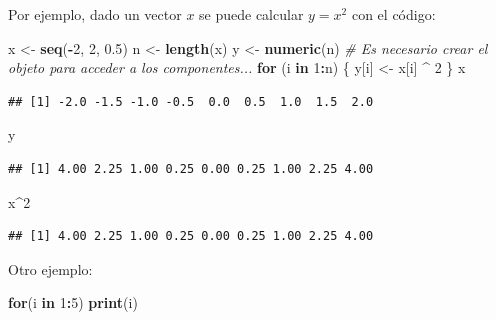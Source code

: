 \documentclass[]{book}
\newenvironment{Shaded}{\begin{snugshade}}{\end{snugshade}}
\newcommand{\CommentTok}[1]{\textcolor[rgb]{0.56,0.35,0.01}{\textit{#1}}}
\newcommand{\ControlFlowTok}[1]{\textcolor[rgb]{0.13,0.29,0.53}{\textbf{#1}}}
\newcommand{\DecValTok}[1]{\textcolor[rgb]{0.00,0.00,0.81}{#1}}
\newcommand{\FloatTok}[1]{\textcolor[rgb]{0.00,0.00,0.81}{#1}}
\newcommand{\KeywordTok}[1]{\textcolor[rgb]{0.13,0.29,0.53}{\textbf{#1}}}
\newcommand{\NormalTok}[1]{#1}
\newcommand{\OperatorTok}[1]{\textcolor[rgb]{0.81,0.36,0.00}{\textbf{#1}}}
\newcommand{\StringTok}[1]{\textcolor[rgb]{0.31,0.60,0.02}{#1}}
\begin{document}
Por ejemplo, dado un vector \(x\) se puede calcular \(y=x^2\) con el código:

\begin{Shaded}
\begin{Highlighting}[]
\NormalTok{x <-}\StringTok{ }\KeywordTok{seq}\NormalTok{(}\OperatorTok{-}\DecValTok{2}\NormalTok{, }\DecValTok{2}\NormalTok{, }\FloatTok{0.5}\NormalTok{)}
\NormalTok{n <-}\StringTok{ }\KeywordTok{length}\NormalTok{(x)}
\NormalTok{y <-}\StringTok{ }\KeywordTok{numeric}\NormalTok{(n) }\CommentTok{# Es necesario crear el objeto para acceder a los componentes...}
\ControlFlowTok{for}\NormalTok{ (i }\ControlFlowTok{in} \DecValTok{1}\OperatorTok{:}\NormalTok{n) \{ y[i] <-}\StringTok{ }\NormalTok{x[i] }\OperatorTok{^}\StringTok{ }\DecValTok{2}\NormalTok{ \}}
\NormalTok{x}
\end{Highlighting}
\end{Shaded}

\begin{verbatim}
## [1] -2.0 -1.5 -1.0 -0.5  0.0  0.5  1.0  1.5  2.0
\end{verbatim}

\begin{Shaded}
\begin{Highlighting}[]
\NormalTok{y}
\end{Highlighting}
\end{Shaded}

\begin{verbatim}
## [1] 4.00 2.25 1.00 0.25 0.00 0.25 1.00 2.25 4.00
\end{verbatim}

\begin{Shaded}
\begin{Highlighting}[]
\NormalTok{x}\OperatorTok{^}\DecValTok{2}
\end{Highlighting}
\end{Shaded}

\begin{verbatim}
## [1] 4.00 2.25 1.00 0.25 0.00 0.25 1.00 2.25 4.00
\end{verbatim}

Otro ejemplo:

\begin{Shaded}
\begin{Highlighting}[]
\ControlFlowTok{for}\NormalTok{(i }\ControlFlowTok{in} \DecValTok{1}\OperatorTok{:}\DecValTok{5}\NormalTok{) }\KeywordTok{print}\NormalTok{(i)}
\end{Highlighting}
\end{Shaded}
\end{document}

